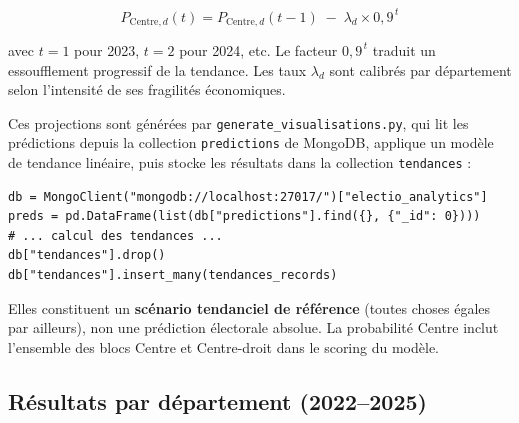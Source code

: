 \begin{equation}
  P_{\text{Centre},d}(t) = P_{\text{Centre},d}(t-1) \;-\; \lambda_d \times 0{,}9^{\,t}
\end{equation}

avec $t = 1$ pour 2023, $t = 2$ pour 2024, etc. Le facteur $0{,}9^{\,t}$ traduit
un essoufflement progressif de la tendance. Les taux $\lambda_d$ sont calibrés
par département selon l'intensité de ses fragilités économiques.

\begin{infobox}
Ces projections sont générées par \texttt{generate\_visualisations.py}, qui lit
les prédictions depuis la collection \texttt{predictions} de MongoDB,
applique un modèle de tendance linéaire, puis stocke les résultats dans la
collection \texttt{tendances} :
\begin{verbatim}
db = MongoClient("mongodb://localhost:27017/")["electio_analytics"]
preds = pd.DataFrame(list(db["predictions"].find({}, {"_id": 0})))
# ... calcul des tendances ...
db["tendances"].drop()
db["tendances"].insert_many(tendances_records)
\end{verbatim}
Elles constituent un \textbf{scénario tendanciel de référence} (toutes choses égales
par ailleurs), non une prédiction électorale absolue. La probabilité Centre inclut
l'ensemble des blocs Centre et Centre-droit dans le scoring du modèle.
\end{infobox}

\subsection{Résultats par département (2022--2025)}

